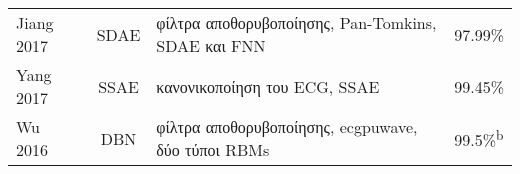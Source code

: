 \begin{sidewaystable}
\begin{tabular}{l c l l}
		Jiang 2017~\cite{jiang2017heartbeat}            & SDAE            & φίλτρα αποθορυβοποίησης, Pan-Tomkins, SDAE και FNN                                                    & 97.99\%                                                                                                                                                                                                                                                                                                                                                                                                                                                                                                                                                                                                                                                                                                                                                                                                                                                                          \\
		Yang 2017~\cite{yang2017novel}                  & SSAE            & κανονικοποίηση του ECG, SSAE                                                                          & 99.45\%                                                                                                                                                                                                                                                                                                                                                                                                                                                                                                                                                                                                                                                                                                                                                                                                                                                                          \\
		Wu 2016~\cite{wu2016novel}                      & DBN             & φίλτρα αποθορυβοποίησης, ecgpuwave, δύο τύποι RBMs                                                    & 99.5\%\textsuperscript{b}                                                                                                                                                                                                                                                                                                                                                                                                                                                                                                                                                                                                                                                                                                                                                                                                                                                   \\

\end{tabular}
\end{sidewaystable}
